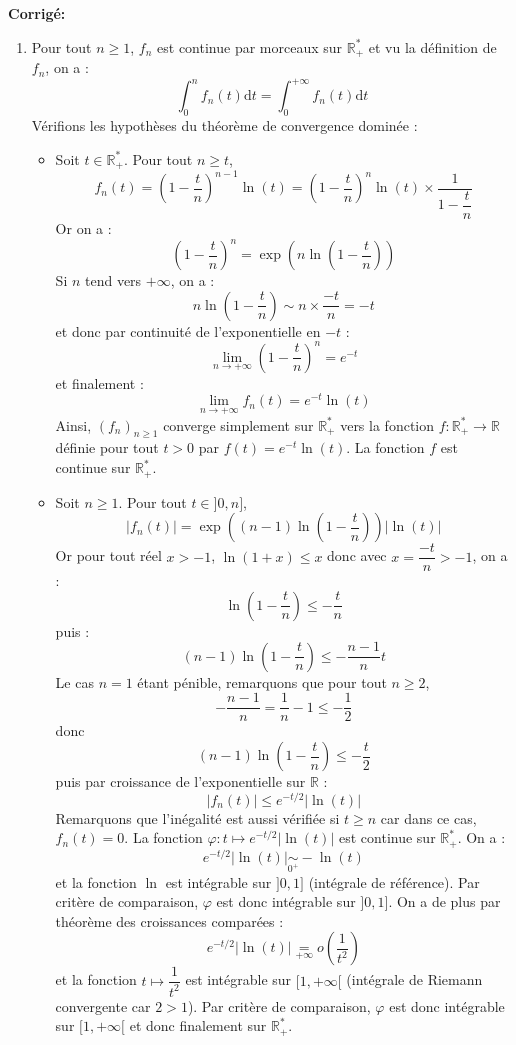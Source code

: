 \documentclass[a4paper,twoside,french,10pt]{VcCours}
\newcommand{\dt}{\text{d}t}
\newcommand{\corr}{\textbf{Corrigé:}}
\begin{document}
\corr \begin{enumerate}
\item Pour tout $n \geq 1$, $f_n$ est continue par morceaux sur $\mathbb{R}_+^{*}$ et vu la définition de $f_n$, on a :
$$ \int_{0}^n f_n(t) \dt  = \int_{0}^{+ \infty} f_n(t) \dt$$
Vérifions les hypothèses du théorème de convergence dominée :
\begin{itemize}
\item Soit $t \in \mathbb{R}_+^{*}$. Pour tout $n \geq t$,
$$ f_n(t) = \left( 1 - \dfrac{t}{n} \right)^{n-1}\ln(t) = \left( 1 - \dfrac{t}{n} \right)^{n}\ln(t) \times \dfrac{1}{1-\dfrac{t}{n}}$$
Or on a :
$$  \left( 1 - \dfrac{t}{n} \right)^{n} = \exp \left( n \ln \left( 1 - \dfrac{t}{n} \right)\right)$$
Si $n$ tend vers $+ \infty$, on a :
$$ n \ln \left( 1 - \dfrac{t}{n} \right) \sim n \times \dfrac{-t}{n} = -t$$
et donc par continuité de l'exponentielle en $-t$ :
$$ \lim_{n \rightarrow + \infty} \left( 1 - \dfrac{t}{n} \right)^{n} = e^{-t}$$
et finalement :
$$ \lim_{n \rightarrow + \infty} f_n(t) = e^{-t} \ln(t)$$
Ainsi, $(f_n)_{n \geq 1}$ converge simplement sur $\mathbb{R}_+^{*}$ vers la fonction $f: \mathbb{R}_+^{*} \rightarrow \mathbb{R}$ définie pour tout $t>0$ par $f(t) =e^{-t} \ln(t)$. La fonction $f$ est continue sur $\mathbb{R}_+^{*}$.
\item Soit $n \geq 1$. Pour tout $t \in ]0,n]$,
$$ \vert f_n(t) \vert =  \exp \left( (n-1) \ln \left( 1 - \dfrac{t}{n} \right)\right) \vert \ln(t) \vert$$
Or pour tout réel $x>-1$, $\ln(1+x) \leq x$ donc avec $x= \dfrac{-t}{n}>-1$, on a :
$$ \ln \left( 1 - \dfrac{t}{n} \right) \leq - \dfrac{t}{n}$$
puis :
$$ (n-1) \ln \left( 1 - \dfrac{t}{n} \right) \leq - \dfrac{n-1}{n} t $$
Le cas $n=1$ étant pénible, remarquons que pour tout $n \geq 2$,
$$ - \dfrac{n-1}{n} = \dfrac{1}{n} - 1 \leq -\dfrac{1}{2}$$
donc 
$$ (n-1) \ln \left( 1 - \dfrac{t}{n}\right) \leq  - \dfrac{t}{2} $$
puis par croissance de l'exponentielle sur $\mathbb{R}$ :
$$ \vert f_n(t) \vert \leq e^{-t/2} \vert \ln(t) \vert $$
Remarquons que l'inégalité est aussi vérifiée si $t \geq n$ car dans ce cas, $f_n(t)=0$. La fonction $ \varphi : t \mapsto e^{-t/2} \vert \ln(t) \vert$ est continue sur $\mathbb{R}_+^{*}$. On a :
$$ e^{-t/2} \vert \ln(t) \vert \underset{0^+}{\sim} -\ln(t)$$
et la fonction $\ln$ est intégrable sur $]0,1]$ (intégrale de référence). Par critère de comparaison, $\varphi$ est donc intégrable sur $]0,1]$. On a de plus par théorème des croissances comparées :
$$ e^{-t/2} \vert \ln(t) \vert \underset{+ \infty}{=} o \left( \dfrac{1}{t^2} \right)$$
et la fonction $t \mapsto \dfrac{1}{t^2}$ est intégrable sur $[1, + \infty[$ (intégrale de Riemann convergente car $2>1$). Par critère de comparaison, $\varphi$ est donc intégrable sur $[1, + \infty[$ et donc finalement sur $\mathbb{R}_+^{*}$.

\end{itemize}
\end{enumerate}
\end{document}
